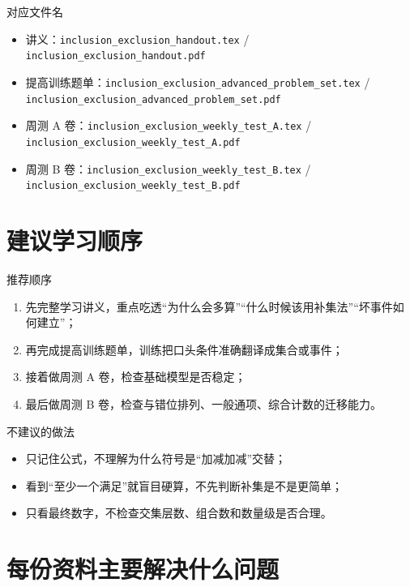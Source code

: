 \documentclass[11pt,a4paper,fontset=fandol]{ctexart}
\begin{document}
\begin{infobox}{对应文件名}
\begin{itemize}
  \item 讲义：\texttt{inclusion\_exclusion\_handout.tex} / \texttt{inclusion\_exclusion\_handout.pdf}
  \item 提高训练题单：\texttt{inclusion\_exclusion\_advanced\_problem\_set.tex} / \texttt{inclusion\_exclusion\_advanced\_problem\_set.pdf}
  \item 周测 A 卷：\texttt{inclusion\_exclusion\_weekly\_test\_A.tex} / \texttt{inclusion\_exclusion\_weekly\_test\_A.pdf}
  \item 周测 B 卷：\texttt{inclusion\_exclusion\_weekly\_test\_B.tex} / \texttt{inclusion\_exclusion\_weekly\_test\_B.pdf}
\end{itemize}
\end{infobox}

\section{建议学习顺序}

\begin{goalbox}{推荐顺序}
\begin{enumerate}
  \item 先完整学习讲义，重点吃透“为什么会多算”“什么时候该用补集法”“坏事件如何建立”；
  \item 再完成提高训练题单，训练把口头条件准确翻译成集合或事件；
  \item 接着做周测 A 卷，检查基础模型是否稳定；
  \item 最后做周测 B 卷，检查与错位排列、一般通项、综合计数的迁移能力。
\end{enumerate}
\end{goalbox}

\begin{warnbox}{不建议的做法}
\begin{itemize}
  \item 只记住公式，不理解为什么符号是“加减加减”交替；
  \item 看到“至少一个满足”就盲目硬算，不先判断补集是不是更简单；
  \item 只看最终数字，不检查交集层数、组合数和数量级是否合理。
\end{itemize}
\end{warnbox}

\section{每份资料主要解决什么问题}
\end{document}
